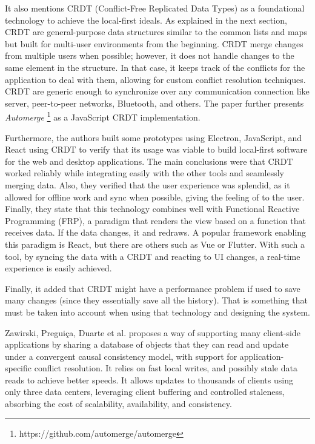 It also mentions CRDT (Conflict-Free Replicated Data Types) as a foundational technology to achieve the local-first ideals. As explained in the next section,  CRDT are general-purpose data structures similar to the common lists and maps but built for multi-user environments from the beginning. CRDT merge changes from multiple users when possible; however, it does not handle changes to the same element in the structure. In that case, it keeps track of the conflicts for the application to deal with them, allowing for custom conflict resolution techniques. CRDT are generic enough to synchronize over any communication connection like server, peer-to-peer networks, Bluetooth, and others. The paper further presents \textit{Automerge} \footnote{https://github.com/automerge/automerge} as a JavaScript CRDT implementation.

Furthermore, the authors built some prototypes using Electron, JavaScript, and React using CRDT to verify that its usage was viable to build local-first software for the web and desktop applications. The main conclusions were that CRDT worked reliably while integrating easily with the other tools and seamlessly merging data. Also, they verified that the user experience was splendid, as it allowed for offline work and sync when possible, giving the feeling of  to the user. Finally, they state that this technology combines well with Functional Reactive Programming (FRP), a paradigm that renders the view based on a function that receives data. If the data changes, it  and redraws. A popular framework enabling this paradigm is React, but there are others such as Vue or Flutter. With such a tool, by syncing the data with a CRDT and reacting to UI changes, a real-time experience is easily achieved.

Finally, it added that CRDT might have a performance problem if used to save many changes (since they essentially save all the history). That is something that must be taken into account when using that technology and designing the system.

Zawirski, Preguiça, Duarte et al. \cite{Zawirski2015} proposes a way of supporting many client-side applications by sharing a database of objects that they can read and update under a convergent causal consistency model, with support for application-specific conflict resolution. It relies on fast local writes, and possibly stale data reads to achieve better speeds. It allows updates to thousands of clients using only three data centers, leveraging client buffering and controlled staleness, absorbing the cost of scalability, availability, and consistency.

